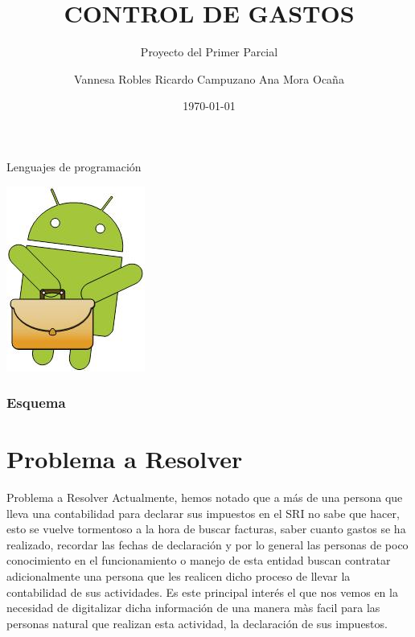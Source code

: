 \documentclass[utf8]{beamer}
\title{CONTROL DE GASTOS}
\subtitle {Proyecto del Primer Parcial}
\author{Vannesa Robles  Ricardo Campuzano  Ana Mora Ocaña}
\date{\today}
\institute {ESPOL}
\begin{document}
\begin{frame}[plain]{Lenguajes de programación}
\begin{center}
\includegraphics [width = 0.2 \textwidth]{logo.jpg} %
\end{center}
\titlepage
\end{frame}

\begin{frame}
\frametitle{Esquema} %
\tableofcontents[pausesections]
\end{frame}

\section{Problema a Resolver}
\begin{frame}[allowframebreaks]

\begin{block}{Problema a Resolver }
Actualmente,  hemos notado que a más de una persona que lleva una contabilidad para declarar sus impuestos en el SRI no sabe que hacer, esto se vuelve tormentoso a la hora de buscar facturas, saber cuanto gastos se ha realizado, recordar las fechas de declaración y por lo general las personas de poco conocimiento en el funcionamiento o manejo de esta entidad buscan contratar adicionalmente una persona que les realicen dicho proceso de llevar la contabilidad de sus actividades. Es este principal interés el que nos vemos en la necesidad de digitalizar dicha información de una manera màs facil para las personas natural que realizan esta actividad, la declaración de sus impuestos.
\end {block}
\end{frame}
\end{document}
